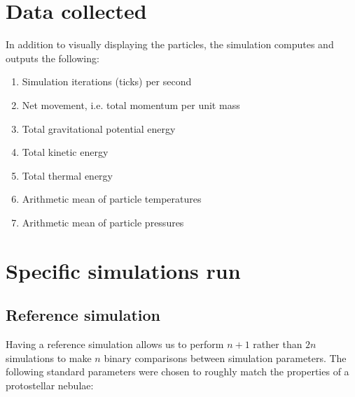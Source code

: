 \documentclass[../main.tex]{subfiles}
\begin{document}
\section{Data collected}
In addition to visually displaying the particles, the simulation computes and outputs the following:
\begin{enumerate}
    \item Simulation iterations (ticks) per second
    \item Net movement, i.e. total momentum per unit mass
    \item Total gravitational potential energy
    \item Total kinetic energy
    \item Total thermal energy
    \item Arithmetic mean of particle temperatures
    \item Arithmetic mean of particle pressures
\end{enumerate}

\section{Specific simulations run}

\subsection{Reference simulation}
Having a reference simulation allows us to perform $n+1$ rather than $2n$ simulations to make $n$
binary comparisons between simulation parameters. The following standard parameters were chosen to
roughly match the properties of a protostellar nebulae:
\\
\end{document}
